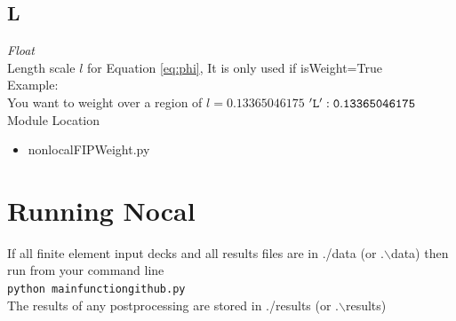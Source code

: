 \documentclass[11pt]{article}
\newcommand{\Eq}{Equation }
\newcommand{\mainFileName}{mainfunctiongithub.py }
\begin{document}
\subsection{L}
\emph{Float} \\
Length scale $l$ for \Eq \ref{eq:phi}, It is only used if isWeight=True\\
Example:\\
You want to weight over a region of $l=0.13365046175$
{$\tt{'L' : 0.13365046175}$}\\
Module Location\\
\begin{itemize}
  \item nonlocalFIPWeight.py
\end{itemize}
\section{Running Nocal}
If all finite element input decks and all results files are in ./data (or .$\backslash$data) then run from your command line\\
{\tt{python \mainFileName}} \\
The results of any postprocessing are stored in ./results (or .$\backslash$results)
\end{document}
